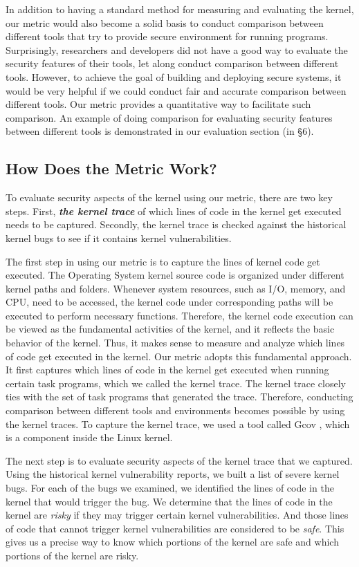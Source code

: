In addition to having a standard method for measuring and evaluating the kernel, 
our metric would also become a solid basis to conduct comparison between different tools that try to 
provide secure environment for running programs. 
Surprisingly, researchers and developers did not have a good way to evaluate the security features 
of their tools, let along conduct comparison between different tools. However, to achieve the 
goal of building and deploying secure systems, it would be very helpful if we could conduct fair and accurate 
comparison between different tools. Our metric provides a quantitative way to 
facilitate such comparison. An example of doing comparison for evaluating security features between different tools is 
demonstrated in our evaluation section (in \S{6}).

\subsection{How Does the Metric Work?}
To evaluate security aspects of the kernel using our metric, there are two key steps. First, 
\textbf{\textit{the kernel trace}} of which lines of code in the kernel get executed needs to be captured. 
Secondly, the kernel trace is checked against the historical kernel bugs to see if it contains kernel vulnerabilities. 

The first step in using our metric is to capture the lines of kernel code get executed. 
The Operating System kernel source code is organized under different kernel paths and folders. 
Whenever system resources, such as I/O, memory, and CPU, need to be accessed, the kernel code 
under corresponding paths will be executed to perform necessary functions. Therefore, the kernel code 
execution can be viewed as the fundamental activities of the kernel, and it reflects the basic behavior of 
the kernel. Thus, it makes sense to measure and analyze which lines of code get executed in the kernel. 
Our metric adopts this fundamental approach. It first captures which lines of code in the kernel get executed 
when running certain task programs, which we called the kernel trace. The kernel trace closely
ties with the set of task programs that generated the trace. Therefore, conducting comparison between 
different tools and environments becomes possible by using the kernel traces. To capture the kernel trace, 
we used a tool called Gcov , which is a component inside the Linux kernel.

The next step is to evaluate security aspects of the kernel trace that we captured. Using the historical kernel vulnerability 
reports, we built a list of severe kernel bugs. For each of the bugs we examined, we identified the lines of code 
in the kernel that would trigger the bug. We determine that the lines of code in the kernel are \textit{risky} if they 
may trigger certain kernel vulnerabilities. And those lines of code that cannot trigger kernel vulnerabilities are 
considered to be \textit{safe}. This gives us a precise way to know which portions of the kernel are safe and which 
portions of the kernel are risky. 

